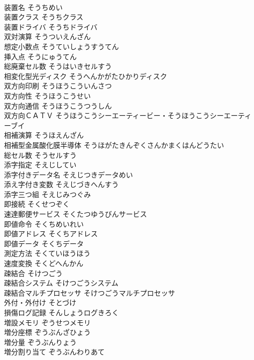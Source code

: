 \documentclass[8pt]{extreport}
\begin{document}
\begin{CJK}{UTF8}{min}
\\	装置名	そうちめい	
\\	装置クラス	そうちクラス	
\\	装置ドライバ	そうちドライバ	
\\	双対演算	そうついえんざん	
\\	想定小数点	そうていしょうすうてん	
\\	挿入点	そうにゅうてん	
\\	総廃棄セル数	そうはいきセルすう	
\\	相変化型光ディスク	そうへんかがたひかりディスク	
\\	双方向印刷	そうほうこういんさつ	
\\	双方向性	そうほうこうせい	
\\	双方向通信	そうほうこうつうしん	
\\	双方向ＣＡＴＶ	そうほうこうシーエーティービー・そうほうこうシーエーティーブイ	
\\	相補演算	そうほえんざん	
\\	相補型金属酸化膜半導体	そうほがたきんぞくさんかまくはんどうたい	
\\	総セル数	そうセルすう	
\\	添字指定	そえじしてい	
\\	添字付きデータ名	そえじつきデータめい	
\\	添え字付き変数	そえじづきへんすう	
\\	添字三つ組	そえじみつぐみ	
\\	即接続	そくせつぞく	
\\	速達郵便サービス	そくたつゆうびんサービス	
\\	即値命令	そくちめいれい	
\\	即値アドレス	そくちアドレス	
\\	即値データ	そくちデータ	
\\	測定方法	そくていほうほう	
\\	速度変換	そくどへんかん	
\\	疎結合	そけつごう	
\\	疎結合システム	そけつごうシステム	
\\	疎結合マルチプロセッサ	そけつごうマルチプロセッサ	
\\	外付・外付け	そとづけ	
\\	損傷ログ記録	そんしょうログきろく	
\\	増設メモリ	ぞうせつメモリ	
\\	増分座標	ぞうぶんざひょう	
\\	増分量	ぞうぶんりょう	
\\	増分割り当て	ぞうぶんわりあて	

\end{CJK}
\end{document}
